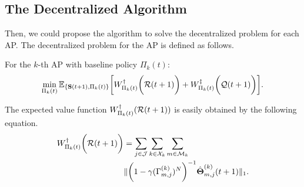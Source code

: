 \subsection{The Decentralized Algorithm}
Then, we could propose the algorithm to solve the decentralized problem for each AP.
The decentralized problem for the AP is defined as follows.
\begin{problem}
    For the $k$-th AP with baseline policy $\Pi_{k}(t)$:
    {\small
    \begin{align}
        \min_{\Pi_{k}(t)} \mathbb{E}_{\{ \mathbf{S}(t+1), \Pi_{k}(t) \}} \bigg[
            W^{\dagger}_{\Pi_{k}(t)}\bigg(\mathcal{R}(t+1)\bigg) + W^{\ddagger}_{\Pi_{k}(t)}\bigg(\mathcal{Q}(t+1)\bigg)
        \bigg].
        \label{eqn:partial}
    \end{align}
    }
\end{problem}

The expected value function $W^{\dagger}_{\Pi_{k}(t)}(\mathcal{R}(t+1))$ is easily obtained by the following equation.
\begin{align}
    W^{\dagger}_{\Pi_{k}(t)}\bigg(\mathcal{R}(t+1)\bigg) &= \sum_{j\in\mathcal{J}}\sum_{k\in\mathcal{X}_{k}}\sum_{m\in\mathcal{M}_{k}}
    \nonumber\\
    &\lVert
        \bigg( 1 - \gamma ({\Gamma}^{(k)}_{m,j})^{N} \bigg)^{-1} \hat{\boldsymbol{\Theta}}^{(k)}_{m,j}(t+1)
    \|_1.
    \label{w_ap}
\end{align}

